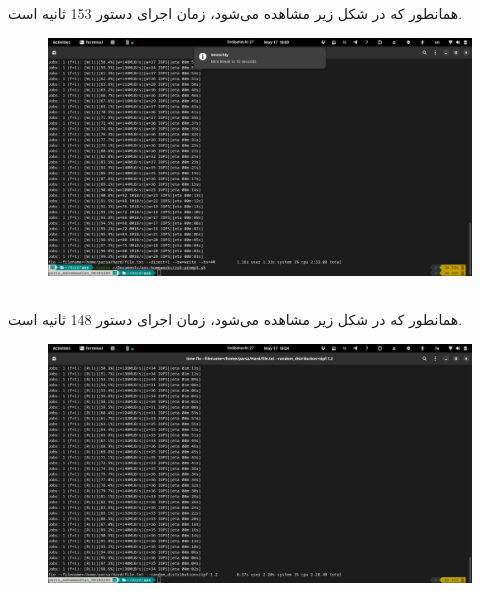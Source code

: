 \documentclass{article}
\begin{document}
\subsection{}
همانطور که در شکل زیر مشاهده می‌شود، زمان اجرای دستور 
153
ثانیه است.

\begin{figure}[H]
    \centering
    \includegraphics[width=\textwidth]{images/3-a.png}
\end{figure}

\subsection{}
همانطور که در شکل زیر مشاهده می‌شود، زمان اجرای دستور
148
ثانیه است.

\begin{figure}[H]
    \centering
    \includegraphics[width=\textwidth]{images/3-b.png}
\end{figure}

\subsection{}
\end{document}
